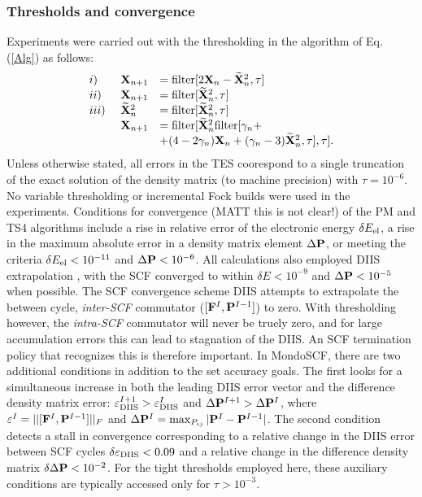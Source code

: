 \commentoutA{\documentclass[prb,aps,twocolumn,twocolumngrid,secnumarabic,superbib,hyperref]{revtex4}}
\begin{document}
{\subsubsection{Thresholds and convergence}
Experiments were carried out with the thresholding in the algorithm of Eq. (\ref{Alg})
as follows:
\begin{equation} 
\begin{array}{lll}
i)    &{\bf X}_{n+1} &= {\rm filter}[2{\bf X}_n - \widetilde{\bf X}^2_n,\tau] \\
ii)   &{\bf X}_{n+1} &= {\rm filter}[\widetilde{\bf X}^2_n,\tau] \\
iii)~ &\widetilde{\bf X}^2_n &= {\rm filter}[\widetilde{\bf X}^2_n,\tau] \\
      &{\bf X}_{n+1} &= 
{\rm filter}[\widetilde{\bf X}^2_n {\rm filter}[\gamma_n + \\
 && +(4-2\gamma_n){\bf X}_n + (\gamma_n-3)\widetilde{\bf X}^2_n,\tau],\tau].
\end{array}
\end{equation}
Unless otherwise stated, all errors in the TES coorespond to a single
truncation of the exact solution of the density matrix (to machine precision) with $\tau=10^{-6}$.
No variable thresholding or incremental Fock builds were used in the experiments. 
Conditions for convergence (MATT this is not clear!) of the PM and TS4 algorithms include a rise in relative 
error of the electronic energy $\delta E_{\rm el}$, a rise in the maximum absolute 
error in a density matrix element $\Delta{\bf P}$, or meeting the criteria 
$\delta E_{\rm el} < 10^{-11}$ and $\Delta{\bf P} < 10^{-6}$.  
All calculations also employed DIIS extrapolation \cite{PPulay88}, with the SCF
converged to within $\delta E < 10^{-9}$ and $\Delta{\bf P} < 10^{-5}$ when possible.
The SCF convergence scheme DIIS attempts to extrapolate the between
cycle, {\em inter-SCF} commutator ($[{\bf F}^{I},{\bf P}^{I-1}]$) to zero.  
With thresholding however, the {\em intra-SCF} commutator 
will never be truely zero, and for large accumulation errors this can lead to 
stagnation of the DIIS.  An SCF termination policy that recognizes this is 
therefore important.  In {\sc MondoSCF}, there are two additional conditions 
in addition to the set accuracy goals.  The first looks for a simultaneous increase 
in both the leading DIIS error vector and the difference density matrix error:
$\varepsilon^{I+1}_{\rm DIIS}>\varepsilon^{I}_{\rm DIIS}$ and 
$\Delta {\bf P}^{I+1}> \Delta {\bf P}^{I}$, where 
$\varepsilon^{I}=||[{\bf F}^{I},{\bf P}^{I-1}]||_F$ and 
$\Delta {\bf P}^{I}=\max_{P_{ij}}|{\bf P}^I-{\bf P}^{I-1}|$.  The second
condition detects a stall in convergence corresponding to a relative change in the 
DIIS error between SCF cycles $\delta { \varepsilon}_{\rm DIIS}<0.09$ and a 
relative change in the difference density matrix $\delta \Delta {\bf P}<10^{-2}$.  
For the tight thresholds employed here, these auxiliary conditions are typically
accessed only for $\tau>10^{-3}$.

}
\end{document}
